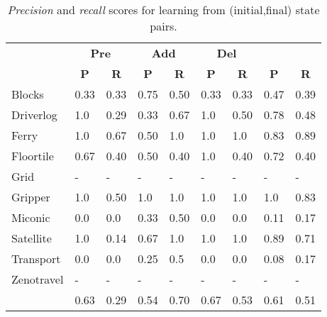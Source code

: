 \documentclass[3p,times]{elsarticle}
\begin{document}
\begin{table}
\begin{footnotesize}
	\begin{center}
		\begin{tabular}{l|l|l|l|l|l|l||l|l|}
			 & \multicolumn{2}{|c|}{\bf Pre} & \multicolumn{2}{|c|}{\bf Add} & \multicolumn{2}{|c||}{\bf Del} & \multicolumn{2}{|c}{\bf}\\ \cline{2-9}			
			  & \multicolumn{1}{|c|}{\bf P} & \multicolumn{1}{|c|}{\bf R} & \multicolumn{1}{|c|}{\bf P} & \multicolumn{1}{|c|}{\bf R} & \multicolumn{1}{|c|}{\bf P} & \multicolumn{1}{|c||}{\bf R} &  \multicolumn{1}{|c|}{\bf P} & \multicolumn{1}{|c|}{\bf R} \\
			\hline
            Blocks & 0.33 & 0.33 & 0.75 & 0.50 & 0.33 & 0.33 & 0.47 & 0.39 \\
            Driverlog & 1.0 & 0.29 & 0.33 & 0.67 & 1.0 & 0.50 & 0.78 & 0.48 \\
            Ferry & 1.0 & 0.67 & 0.50 & 1.0 & 1.0 & 1.0 & 0.83 & 0.89 \\
            Floortile & 0.67 & 0.40 & 0.50 & 0.40 & 1.0 & 0.40 & 0.72 & 0.40 \\
            Grid & - & - & - & - & - & - & - & - \\
            Gripper & 1.0 & 0.50 & 1.0 & 1.0 & 1.0 & 1.0 & 1.0 & 0.83 \\
            Miconic & 0.0 & 0.0 & 0.33 & 0.50 & 0.0 & 0.0 & 0.11 & 0.17 \\
            Satellite & 1.0 & 0.14 & 0.67 & 1.0 & 1.0 & 1.0 & 0.89 & 0.71 \\
            Transport & 0.0 & 0.0 & 0.25 & 0.5 & 0.0 & 0.0 & 0.08 & 0.17 \\
            Zenotravel & - & - & - & - & - & - & - & - \\
            \hline
            & 0.63 & 0.29 & 0.54 & 0.70 & 0.67 & 0.53 & 0.61 & 0.51 \\			
			\end{tabular}
	\end{center}
\end{footnotesize}
\caption{\small {\em Precision} and {\em recall} scores for learning from (initial,final) state pairs.}
\label{tab:results_states}
\end{table}
\end{document}
